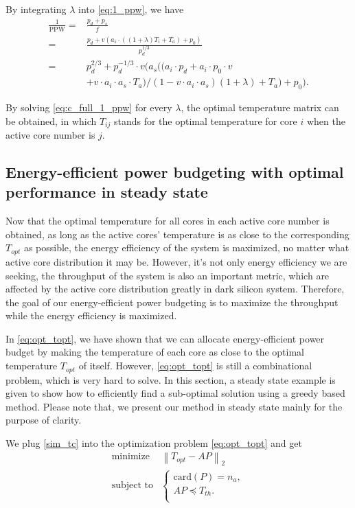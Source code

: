 By integrating $\lambda$ into \eqref{eq:1_ppw}, we have
\begin{equation}\label{eq:c_full_1_ppw}
\begin{split}
\frac{1}{\text{PPW}}=&\frac{p_{d}+p_{s}}{f}\\
=&\frac{p_{d}+v(a_{s} \cdot ((1+\lambda)T_{i}+T_{a})+p_{0})}{p_{d}^{1/3}}\\
=&p_{d}^{2/3}+p_{d}^{-1/3}\cdot v(a_{s} ((a_{i} \cdot p_{d}+a_{i} \cdot p_{0} \cdot v\\
&+ v \cdot a_{i} \cdot a_{s} \cdot T_{a})/(1-v \cdot a_{i} \cdot a_{s})(1+\lambda)+T_{a})+p_{0}).
\end{split}
\end{equation}

By solving \eqref{eq:c_full_1_ppw} for every $\lambda$, the optimal temperature matrix can be obtained, in which $T_{ij}$ stands for the optimal temperature for core $i$ when the active core number is $j$.

\subsection{Energy-efficient power budgeting with optimal performance in steady state}
Now that the optimal temperature for all cores in each active core number is obtained, as long as the active cores' temperature is as close to the corresponding $T_{opt}$ as possible, the energy efficiency of the system is maximized, no matter what active core distribution it may be. However, it's not only energy efficiency we are seeking, the throughput of the system is also an important metric, which are affected by the active core distribution greatly in dark silicon system. Therefore, the goal of our energy-efficient power budgeting is to maximize the throughput while the energy efficiency is maximized.

In \eqref{eq:opt_topt}, we have shown that we can allocate energy-efficient power budget by making the temperature of each core as close to the optimal temperature $T_{opt}$ of itself. However, \eqref{eq:opt_topt} is still a combinational problem, which is very hard to solve. In this section, a steady state example is given to show how to efficiently find a sub-optimal solution using a greedy based method. Please note that, we present our method in steady state mainly for the purpose of clarity.

We plug \eqref{sim_tc} into the optimization problem \eqref{eq:opt_topt} and get
\begin{equation}\label{eq:sim_opt_topt}
\begin{split}
\text{minimize } &  \left \| T_{opt} - AP \right \|_{2}\\
\text{subject to} &\left\{
\begin{array}{lr}
\text{card}(P) = n_{a},\\
AP \preceq T_{th}.\\
\end{array}
\right.
\end{split}
\end{equation}

